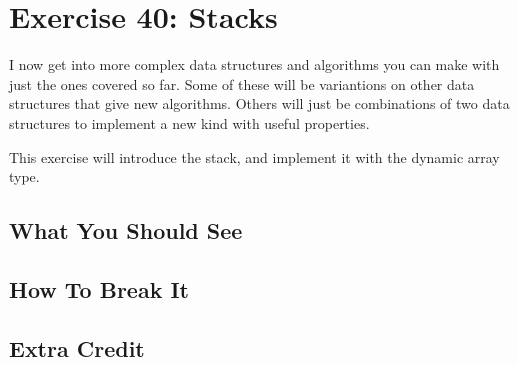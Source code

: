 \chapter{Exercise 40: Stacks}

I now get into more complex data structures and algorithms you can make with just the ones
covered so far.  Some of these will be variantions on other data structures that give new
algorithms.  Others will just be combinations of two data structures to implement a new
kind with useful properties.

This exercise will introduce the stack, and implement it with the dynamic array type.


\section{What You Should See}


\section{How To Break It}


\section{Extra Credit}



